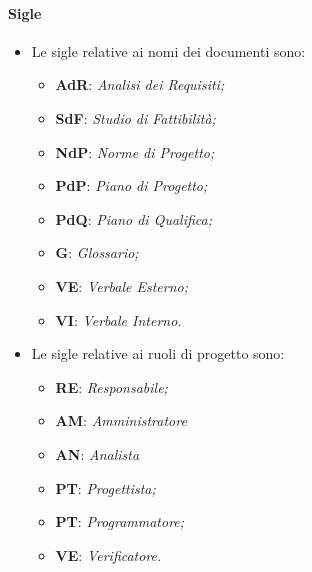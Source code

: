 \paragraph{Sigle}
\begin{itemize}
	\item Le sigle relative ai nomi dei documenti sono:
	\begin{itemize}

		\item \textbf{AdR}: \textit{Analisi dei Requisiti;}
	
		\item \textbf{SdF}: \textit{Studio di Fattibilità;}
	
		\item \textbf{NdP}: \textit{Norme di Progetto;}
	
		\item \textbf{PdP}: \textit{Piano di Progetto;}
	
		\item \textbf{PdQ}: \textit{Piano di Qualifica;}
	
		\item \textbf{G}: \textit{Glossario;}
	
		\item \textbf{VE}: \textit{Verbale Esterno;}
	
		\item \textbf{VI}: \textit{Verbale Interno.}
	
	\end{itemize}
	
	\item Le sigle relative ai ruoli di progetto sono:
	
	\begin{itemize}
		
		\item \textbf{RE}: \textit{Responsabile;}
		
		\item \textbf{AM}: \textit{Amministratore}
		
		\item \textbf{AN}: \textit{Analista}
		
		\item \textbf{PT}: \textit{Progettista;}
		
		\item \textbf{PT}: \textit{Programmatore;}
		
		\item \textbf{VE}: \textit{Verificatore.}
	
	\end{itemize}
	

\end{itemize}

